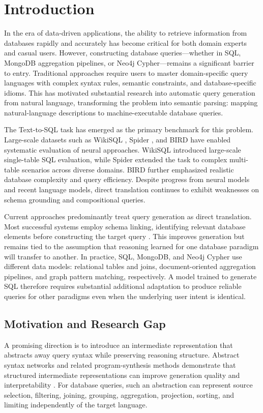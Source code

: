 \documentclass[conference]{IEEEtran}
\begin{document}
\section{Introduction}
In the era of data-driven applications, the ability to retrieve information from databases rapidly and accurately has become critical for both domain experts and casual users. However, constructing database queries---whether in SQL, MongoDB aggregation pipelines, or Neo4j Cypher---remains a significant barrier to entry. Traditional approaches require users to master domain-specific query languages with complex syntax rules, semantic constraints, and database-specific idioms. This has motivated substantial research into automatic query generation from natural language, transforming the problem into semantic parsing: mapping natural-language descriptions to machine-executable database queries.

The Text-to-SQL task has emerged as the primary benchmark for this problem. Large-scale datasets such as WikiSQL \cite{b1}, Spider \cite{b2}, and BIRD \cite{b3} have enabled systematic evaluation of neural approaches. WikiSQL introduced large-scale single-table SQL evaluation, while Spider extended the task to complex multi-table scenarios across diverse domains. BIRD further emphasized realistic database complexity and query efficiency. Despite progress from neural models and recent language models, direct translation continues to exhibit weaknesses on schema grounding and compositional queries.

Current approaches predominantly treat query generation as direct translation. Most successful systems employ schema linking, identifying relevant database elements before constructing the target query \cite{b4,b5}. This improves generation but remains tied to the assumption that reasoning learned for one database paradigm will transfer to another. In practice, SQL, MongoDB, and Neo4j Cypher use different data models: relational tables and joins, document-oriented aggregation pipelines, and graph pattern matching, respectively. A model trained to generate SQL therefore requires substantial additional adaptation to produce reliable queries for other paradigms even when the underlying user intent is identical.

\subsection{Motivation and Research Gap}
A promising direction is to introduce an intermediate representation that abstracts away query syntax while preserving reasoning structure. Abstract syntax networks and related program-synthesis methods demonstrate that structured intermediate representations can improve generation quality and interpretability \cite{b11,b12}. For database queries, such an abstraction can represent source selection, filtering, joining, grouping, aggregation, projection, sorting, and limiting independently of the target language.
\end{document}
